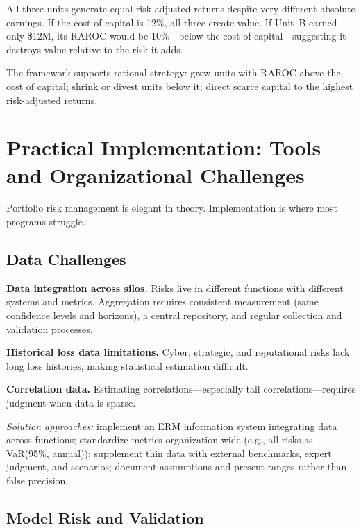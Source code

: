 \documentclass[11pt,openany]{book}
\begin{document}
All three units generate equal risk-adjusted returns despite very different
absolute earnings. If the cost of capital is 12\%, all three create value. If
Unit~B earned only \$12M, its RAROC would be 10\%---below the cost of
capital---suggesting it destroys value relative to the risk it adds.

The framework supports rational strategy: grow units with RAROC above the cost
of capital; shrink or divest units below it; direct scarce capital to the
highest risk-adjusted returns.

\section{Practical Implementation: Tools and Organizational Challenges}
\label{sec:implementation}

Portfolio risk management is elegant in theory. Implementation is where most
programs struggle.

\subsection{Data Challenges}
\label{subsec:data-challenges}

\textbf{Data integration across silos.} Risks live in different functions with
different systems and metrics. Aggregation requires consistent measurement
(same confidence levels and horizons), a central repository, and regular
collection and validation processes.

\textbf{Historical loss data limitations.} Cyber, strategic, and reputational
risks lack long loss histories, making statistical estimation difficult.

\textbf{Correlation data.} Estimating correlations---especially tail
correlations---requires judgment when data is sparse.

\emph{Solution approaches:} implement an ERM information system integrating
data across functions; standardize metrics organization-wide (e.g., all risks
as VaR(95\%, annual)); supplement thin data with external benchmarks, expert
judgment, and scenarios; document assumptions and present ranges rather than
false precision.

\subsection{Model Risk and Validation}
\label{subsec:model-risk}
\end{document}
